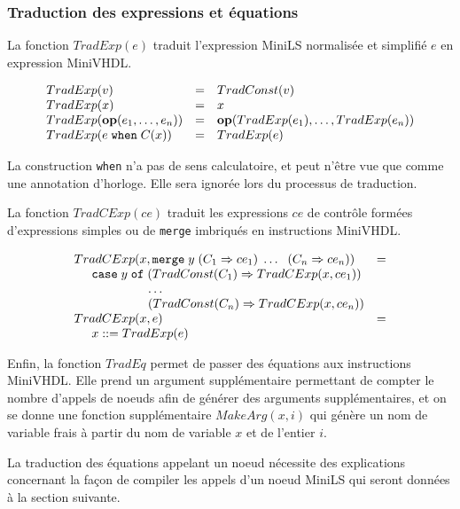 \documentclass[a4paper]{article}
\newcommand{\minils}{{\sc MiniLS}}
\newcommand{\minivhdl}{{\sc MiniVHDL}}
\newcommand{\mybox}[1]{\mbox{\tt{#1}}}
\newcommand{\ind}[0]{\hspace{0.5cm}}
\newcommand{\coloneqq}[0]{::=}
\newcommand{\Op}[2]{\mybox{\bf{op}}(#1,\dots,#2)}
\newcommand{\When}[3]{#1 \; \mybox{when} \; #2(#3)}
\newcommand{\Merge}[5]{\mybox{merge} \; #1 \; (#2 \Rightarrow #3) \; \dots \; \
  (#4 \Rightarrow #5)}
\newcommand{\Affect}[2]{#1 \coloneqq #2}
\begin{document}
\subsubsection{Traduction des expressions et équations}

La fonction $TradExp(e)$ traduit l'expression \minils{} normalisée et
simplifié $e$ en expression \minivhdl{}.

\newcommand{\TradE}[1]{TradExp(#1)}

\[
\begin{array}{lcl}
  \TradE{v} & = & \TradC{v} \\
  \TradE{x} & = & x \\
  \TradE{\Op{e_1}{e_n}} & = & \Op{\TradE{e_1}}{\TradE{e_n}} \\
  \TradE{\When{e}{C}{x}} & = & \TradE{e}
\end{array}
\]

La construction \texttt{when} n'a pas de sens calculatoire, et peut n'être vue
que comme une annotation d'horloge. Elle sera ignorée lors du processus de
traduction.

La fonction $TradCExp(ce)$ traduit les expressions $ce$ de contrôle formées
d'expressions simples ou de \texttt{merge} imbriqués en instructions \minivhdl{}.

\newcommand{\TradCE}[2]{TradCExp(#1, #2)}

\[
\begin{array}{ll}
  \TradCE{x}{\Merge{y}{C_1}{ce_1}{C_n}{ce_n}} & = \\
  \ind \mathtt{case} \; y \; \mathtt{of} \;
  (\TradC{C_1} \Rightarrow \TradCE{x}{ce_1}) \\
  \hspace{2.1cm} \dots \\
  \hspace{2.1cm} (\TradC{C_n} \Rightarrow \TradCE{x}{ce_n}) \\
  \TradCE{x}{e} & = \\
  \ind \Affect{x}{\TradE{e}}
\end{array}
\]

Enfin, la fonction $TradEq$ permet de passer des équations aux instructions
\minivhdl{}. Elle prend un argument supplémentaire permettant de compter le nombre
d'appels de noeuds afin de générer des arguments supplémentaires, et on se donne
une fonction supplémentaire $MakeArg(x,i)$ qui génère un nom de variable frais à
partir du nom de variable $x$ et de l'entier $i$.

La traduction des équations appelant un noeud nécessite des explications
concernant la fa\c{c}on de compiler les appels d'un noeud \minils{} qui seront données
à la section suivante.
\end{document}
